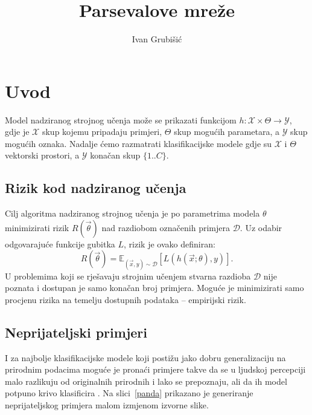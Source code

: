 \documentclass[utf8, seminar, numeric, lmodern]{feri}
\begin{document}
\title{Parsevalove mreže}

\author{Ivan Grubišić}

\maketitle

\thispagestyle{empty}
\clearpage
{
	\hypersetup{linkcolor=black}
	\tableofcontents
}



\chapter{Uvod}

Model nadziranog strojnog učenja može se prikazati funkcijom $h:\mathcal{X}\times\Theta\to\mathcal{Y}$, gdje je $\mathcal{X}$ skup kojemu pripadaju primjeri, $\Theta$ skup mogućih parametara, a $\mathcal{Y}$ skup mogućih oznaka. Nadalje ćemo razmatrati klasifikacijske modele gdje su $\mathcal{X}$ i $\Theta$ vektorski prostori, a $\mathcal{Y}$ konačan skup $\{1..C\}$.

\section{Rizik kod nadziranog učenja}

Cilj algoritma nadziranog strojnog učenja je po parametrima modela $\theta$ minimizirati rizik $R(\vec\theta)$ nad razdiobom označenih primjera $\mathcal{D}$. Uz odabir odgovarajuće funkcije gubitka $L$, rizik je ovako definiran:
\begin{equation}
R(\vec\theta) = \mathbb{E}_{(\vec x,y)\sim\mathcal{D}}\left[L(h(\vec x; \theta), y)\right].
\end{equation}
U problemima koji se rješavaju strojnim učenjem stvarna razdioba $\mathcal{D}$ nije poznata i dostupan je samo konačan broj primjera. Moguće je minimizirati samo procjenu rizika na temelju dostupnih podataka -- empirijski rizik.

\section{Neprijateljski primjeri}

I za najbolje klasifikacijske modele koji postižu jako dobru generalizaciju na prirodnim podacima moguće je pronaći primjere takve da se u ljudskoj percepciji malo razlikuju od originalnih prirodnih i lako se prepoznaju, ali da ih model potpuno krivo klasificira \cite{szegedy13-intrig-ipnn, goodfellow14-ehae}. Na slici~\ref{panda} prikazano je generiranje neprijateljskog primjera malom izmjenom izvorne slike.
\end{document}
